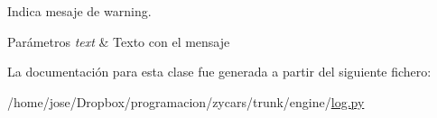\-Indica mesaje de warning. 


\begin{DoxyParams}{\-Parámetros}
{\em text} & \-Texto con el mensaje \\
\hline
\end{DoxyParams}


\-La documentación para esta clase fue generada a partir del siguiente fichero\-:\begin{DoxyCompactItemize}
\item 
/home/jose/\-Dropbox/programacion/zycars/trunk/engine/\hyperlink{log_8py}{log.\-py}\end{DoxyCompactItemize}
